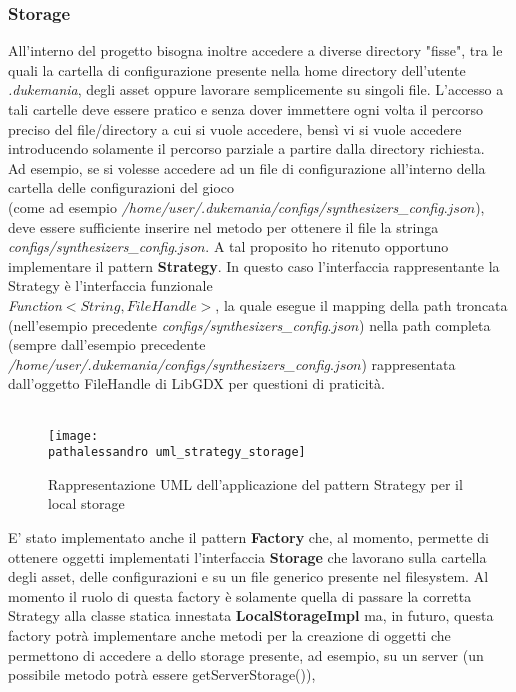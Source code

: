 \documentclass[a4paper,12pt]{report}
\newcommand\pathalessandro{img/alessandro/}
\begin{document}
\subsubsection{Storage}
All'interno del progetto bisogna inoltre accedere a diverse directory "fisse", tra le quali la cartella di configurazione presente nella home
directory dell'utente \emph{.dukemania}, degli asset oppure lavorare semplicemente su singoli file.
L'accesso a tali cartelle deve essere pratico e senza dover immettere ogni volta il percorso preciso del file/directory a cui si vuole accedere,
bensì vi si vuole accedere introducendo solamente il percorso parziale a partire dalla directory richiesta. \\
Ad esempio, se si volesse accedere ad un file di configurazione all'interno della cartella delle configurazioni del gioco \\
(come ad esempio \emph{\//home\//user\//.dukemania\//configs\//synthesizers\_config$.json$}), deve essere sufficiente inserire nel metodo per ottenere il file
la stringa \\ \emph{configs\//synthesizers\_config$.json$}.
A tal proposito ho ritenuto opportuno implementare il pattern \textbf{Strategy}.
In questo caso l'interfaccia rappresentante la Strategy è l'interfaccia funzionale  \\ 
\emph{Function$<String, FileHandle>$}, la quale esegue il mapping della path troncata (nell'esempio precedente
\emph{configs\//synthesizers\_config$.json$}) nella path completa (sempre dall'esempio precedente \\
\emph{\//home\//user\//.dukemania\//configs\//synthesizers\_config$.json$}) rappresentata dall'oggetto FileHandle di LibGDX per
questioni di praticità. \\ \\
\begin{figure}[!htb]
	\centerline{\texttt{[image: \\pathalessandro uml\_strategy\_storage]}}
	\caption{Rappresentazione UML dell'applicazione del pattern Strategy per il local storage}
	\label{img:uml_strategy_storage}
\end{figure}
\clearpage \hfill\break
E' stato implementato anche il pattern \textbf{Factory} che, al momento, permette di ottenere oggetti implementati l'interfaccia \textbf{Storage} che lavorano
sulla cartella degli asset, delle configurazioni e su un file generico presente nel filesystem. 
Al momento il ruolo di questa factory è solamente quella di passare la corretta Strategy alla classe statica innestata \textbf{LocalStorageImpl} ma, 
in futuro, questa factory potrà implementare anche metodi per la creazione di oggetti che permettono di accedere a dello storage presente, ad esempio, su un server (un possibile metodo potrà essere getServerStorage()),
\end{document}
